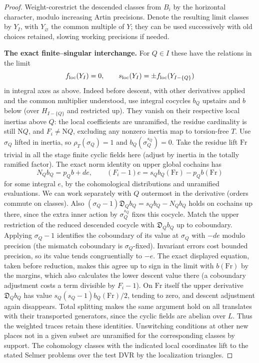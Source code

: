 \begin{proof}
Weight-corestrict the descended classes from \(B_i\) by the horizontal character, modulo
increasing Artin precisions. Denote the resulting limit classes by \(Y_I\), with
\(Y_\varnothing\) the common multiple of \(Y\); they can be used successively with old choices
retained, slowing working precisions if needed.

\par\smallskip\noindent\textbf{The exact finite--singular interchange.}\enspace
For \(Q\in I\) these have the relations in the limit
\begin{equation}\label{cm:eq:interchange}
f_{\rm loc}(Y_I)=0,\qquad
                     s_{\rm loc}(Y_I)=\pm f_{\rm loc}(Y_{I-\{Q\}})
\end{equation}
in integral axes as above. Indeed before descent, with other derivatives applied and the
common multiplier understood, use integral cocycles \(b_Q\) upstairs and \(b\) below (over
\(H_{I-\{Q\}}\) and restricted up). They vanish on their respective local inertias above
\(Q\): the local coefficients are unramified, the residue cardinality is still \(\mathrm N
Q\), and \(F_i\ne\mathrm N Q\), excluding any nonzero inertia map to torsion-free \(T\). Use
\(\sigma_Q\) lifted in inertia, so \(\rho_T(\sigma_Q)=1\) and \(b_Q(\sigma_Q^{s_Q})=0\). Take
the residue lift \(\mathrm{Fr}\) trivial in all the stage finite cyclic fields here (adjust by
inertia in the totally ramified factor). The exact norm identity on upper global cochains has
\begin{equation}\label{cm:eq:cochain-norm}
N_Q b_Q=p_Q b+d e,\qquad
           (F_i-1)e=s_Q b_Q(\mathrm{Fr})-p_Q b(\mathrm{Fr})
\end{equation}
for some integral \(e\), by the cohomological distributions and unramified evaluations. We can
work separately with \(Q\) outermost in the derivative (orders commute on classes). Also
\((\sigma_Q-1)\mathfrak D_Q b_Q=s_Q b_Q-N_Q b_Q\) holds on cochains up there, since the extra
inner action by \(\sigma_Q^{s_Q}\) fixes this cocycle. Match the upper restriction of the
reduced descended cocycle with \(\mathfrak D_Q b_Q\) up to coboundary. Applying \(\sigma_Q-1\)
identifies the coboundary of its value at \(\sigma_Q\) with \(-d e\) modulo precision (the
mismatch coboundary is \(\sigma_Q\)-fixed). Invariant errors cost bounded precision, so its
value tends congruentially to \(-e\). The exact displayed equation, taken before reduction,
makes this agree up to sign in the limit with \(b(\mathrm{Fr})\) by the margins, which also
calculates the lower descent value there (a coboundary adjustment costs a term divisible by
\(F_i-1\)). On \(\mathrm{Fr}\) itself the upper derivative \(\mathfrak D_Q b_Q\) has value
\(s_Q(s_Q-1)b_Q(\mathrm{Fr})/2\), tending to zero, and descent adjustment again disappears.
Total splitting makes the same argument hold on all translates with their transported
generators, since the cyclic fields are abelian over \(L\). Thus the weighted traces retain
these identities. Unswitching conditions at other new places not in a given subset are
unramified for the corresponding classes by support. The cohomology classes with the indicated
local coordinates lift to the stated Selmer problems over the test DVR by the localization
triangles.


\end{proof}
